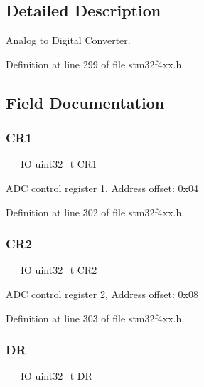 \subsection{Detailed Description}
Analog to Digital Converter. 

Definition at line 299 of file stm32f4xx.\+h.



\subsection{Field Documentation}
\mbox{\label{struct_a_d_c___type_def_ab0ec7102960640751d44e92ddac994f0}} 
\subsubsection{\texorpdfstring{C\+R1}{CR1}}
{\footnotesize\ttfamily \hyperlink{group___c_m_s_i_s__core__definitions_gaec43007d9998a0a0e01faede4133d6be}{\+\_\+\+\_\+\+IO} uint32\+\_\+t C\+R1}

A\+DC control register 1, Address offset\+: 0x04 

Definition at line 302 of file stm32f4xx.\+h.

\mbox{\label{struct_a_d_c___type_def_afdfa307571967afb1d97943e982b6586}} 
\subsubsection{\texorpdfstring{C\+R2}{CR2}}
{\footnotesize\ttfamily \hyperlink{group___c_m_s_i_s__core__definitions_gaec43007d9998a0a0e01faede4133d6be}{\+\_\+\+\_\+\+IO} uint32\+\_\+t C\+R2}

A\+DC control register 2, Address offset\+: 0x08 

Definition at line 303 of file stm32f4xx.\+h.

\mbox{\label{struct_a_d_c___type_def_a3df0d8dfcd1ec958659ffe21eb64fa94}} 
\subsubsection{\texorpdfstring{DR}{DR}}
{\footnotesize\ttfamily \hyperlink{group___c_m_s_i_s__core__definitions_gaec43007d9998a0a0e01faede4133d6be}{\+\_\+\+\_\+\+IO} uint32\+\_\+t DR}

